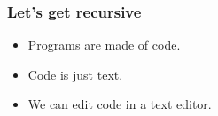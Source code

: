 \documentclass{beamer}
\begin{document}
\begin{frame}
\frametitle{Let's get recursive}
	\begin{itemize}
	\item Programs are made of code.
	\item Code is just text.
	\item We can edit code in a text editor.
	\end{itemize}
\end{frame} 
\end{document}
